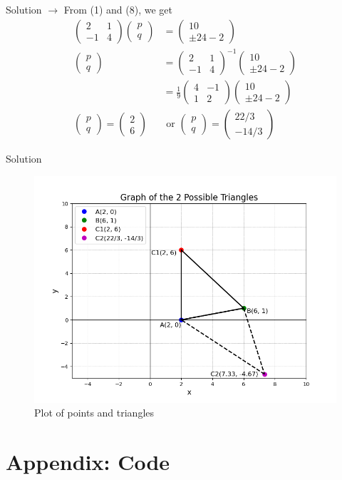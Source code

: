 \documentclass{beamer}
\numberwithin{equation}{section}
\theoremstyle{remark}
\newcommand{\myvec}[1]{\ensuremath{\begin{pmatrix}#1\end{pmatrix}}}
\begin{document}
\begin{frame}{Solution}
$\rightarrow$ From (1) and (8), we get
\begin{align}
    \myvec{2 & 1\\-1 & 4} \myvec{p\\q} &= \myvec{10\\\pm 24 - 2} \\
    \myvec{p\\q} &= \myvec{2 & 1\\-1 & 4}^{-1} \myvec{10\\ \pm 24 - 2} \\
    &= \frac{1}{9} \myvec{4 & -1\\1 & 2} \myvec{10\\ \pm 24 - 2} \\
    \myvec{p\\q} = \myvec{2\\6} &\text{ or } \myvec{p\\q} = \myvec{22/3\\ -14/3}
\end{align}
\end{frame}

\begin{frame}{Solution}
\begin{figure}[h!]
   \centering
   \includegraphics[width=0.8\linewidth]{figs/01.png}
   \caption{Plot of points and triangles}
   \label{Plot_1}
\end{figure}
\end{frame}

\section*{Appendix: Code}
\end{document}
